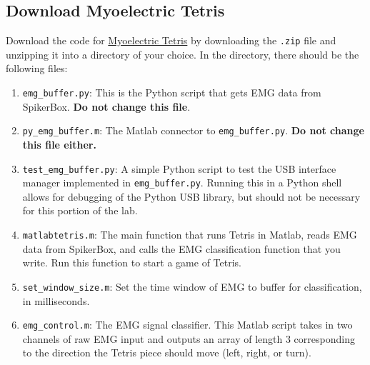 \documentclass[10pt,oneside,a4paper]{article}
\begin{document}
\subsection{Download Myoelectric Tetris}
Download the code for \href{https://github.com/mfliu/Myoeletric_Tetris} {\color{blue} Myoelectric Tetris} by downloading the \texttt{.zip} file and unzipping it into a directory of your choice. In the directory, there should be the following files: \\
\begin{enumerate}
\item \texttt{emg\_buffer.py}: This is the Python script that gets EMG data from SpikerBox. \textbf{Do not change this file}.
\item \texttt{py\_emg\_buffer.m}: The Matlab connector to \texttt{emg\_buffer.py}. \textbf{Do not change this file either.}
\item \texttt{test\_emg\_buffer.py}: A simple Python script to test the USB interface manager implemented in \texttt{emg\_buffer.py}. Running this in a Python shell allows for debugging of the Python USB library, but should not be necessary for this portion of the lab.
\item \texttt{matlabtetris.m}: The main function that runs Tetris in Matlab, reads EMG data from SpikerBox, and calls the EMG classification function that you write. Run this function to start a game of Tetris.
\item \texttt{set\_window\_size.m}: Set the time window of EMG to buffer for classification, in milliseconds. 
\item \texttt{emg\_control.m}: The EMG signal classifier. This Matlab script takes in two channels of raw EMG input and outputs an array of length 3 corresponding to the direction the Tetris piece should move (left, right, or turn).
\end{enumerate}
\end{document}
